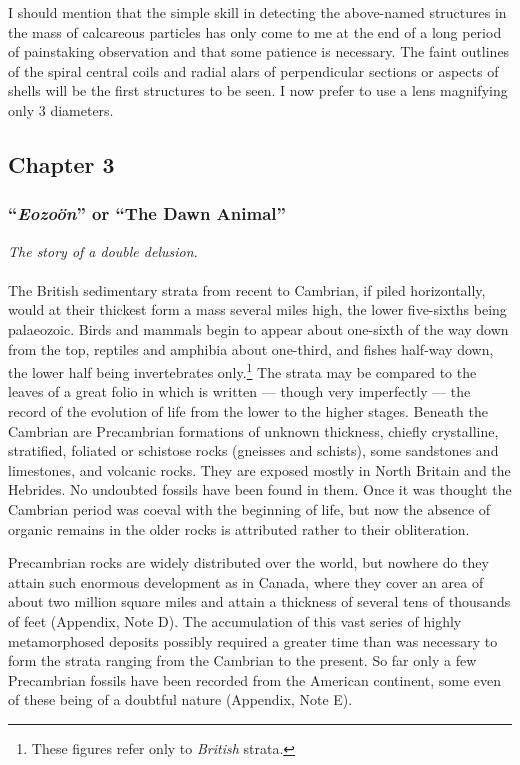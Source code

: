 \documentclass[a4paper, 12pt, oneside]{article}
\begin{document}
I should mention that the simple skill in detecting the above-named structures in the mass of calcareous particles has only come to me at the end of a long period of painstaking observation and that some patience is necessary. The faint outlines of the spiral central coils and radial alars of perpendicular sections or aspects of shells will be the first structures to be seen. I now prefer to use a lens magnifying only 3 diameters.
\clearpage
\subsection{Chapter 3}
\subsubsection{``\emph{Eozoön}'' or ``The Dawn Animal''}
\centerline{\emph{The story of a double delusion.}}
\paragraph{}
The British sedimentary strata from recent to Cambrian, if piled horizontally, would at their thickest form a mass several miles high, the lower five-sixths being palaeozoic. Birds and mammals begin to appear about one-sixth of the way down from the top, reptiles and amphibia about one-third, and fishes half-way down, the lower half being invertebrates only.\footnote{These figures refer only to \emph{British} strata.} The strata may be compared to the leaves of a great folio in which is written --- though very imperfectly --- the record of the evolution of life from the lower to the higher stages. Beneath the Cambrian are Precambrian formations of unknown thickness, chiefly crystalline, stratified, foliated or schistose rocks (gneisses and schists), some sandstones and limestones, and volcanic rocks. They are exposed mostly in North Britain and the Hebrides. No undoubted fossils have been found in them. Once it was thought the Cambrian period was coeval with the beginning of life, but now the absence of organic remains in the older rocks is attributed rather to their obliteration.

Precambrian rocks are widely distributed over the world, but nowhere do they attain such enormous development as in Canada, where they cover an area of about two million square miles and attain a thickness of several tens of thousands of feet (Appendix, Note D). The accumulation of this vast series of highly metamorphosed deposits possibly required a greater time than was necessary to form the strata ranging from the Cambrian to the present. So far only a few Precambrian fossils have been recorded from the American continent, some even of these being of a doubtful nature (Appendix, Note E).
\end{document}

